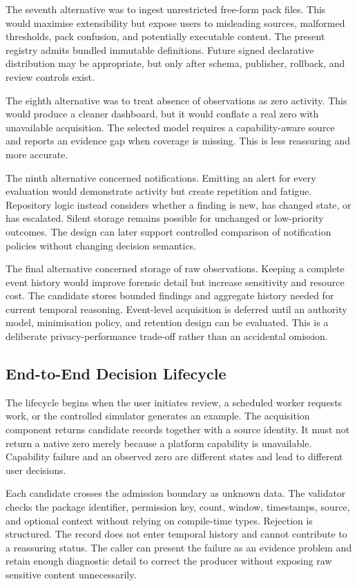 The seventh alternative was to ingest unrestricted free-form pack files. This would maximise extensibility but expose users to misleading sources, malformed thresholds, pack confusion, and potentially executable content. The present registry admits bundled immutable definitions. Future signed declarative distribution may be appropriate, but only after schema, publisher, rollback, and review controls exist.

The eighth alternative was to treat absence of observations as zero activity. This would produce a cleaner dashboard, but it would conflate a real zero with unavailable acquisition. The selected model requires a capability-aware source and reports an evidence gap when coverage is missing. This is less reassuring and more accurate.

The ninth alternative concerned notifications. Emitting an alert for every evaluation would demonstrate activity but create repetition and fatigue. Repository logic instead considers whether a finding is new, has changed state, or has escalated. Silent storage remains possible for unchanged or low-priority outcomes. The design can later support controlled comparison of notification policies without changing decision semantics.

The final alternative concerned storage of raw observations. Keeping a complete event history would improve forensic detail but increase sensitivity and resource cost. The candidate stores bounded findings and aggregate history needed for current temporal reasoning. Event-level acquisition is deferred until an authority model, minimisation policy, and retention design can be evaluated. This is a deliberate privacy-performance trade-off rather than an accidental omission.

\subsection{End-to-End Decision Lifecycle}

The lifecycle begins when the user initiates review, a scheduled worker requests work, or the controlled simulator generates an example. The acquisition component returns candidate records together with a source identity. It must not return a native zero merely because a platform capability is unavailable. Capability failure and an observed zero are different states and lead to different user decisions.

Each candidate crosses the admission boundary as unknown data. The validator checks the package identifier, permission key, count, window, timestamps, source, and optional context without relying on compile-time types. Rejection is structured. The record does not enter temporal history and cannot contribute to a reassuring status. The caller can present the failure as an evidence problem and retain enough diagnostic detail to correct the producer without exposing raw sensitive content unnecessarily.

